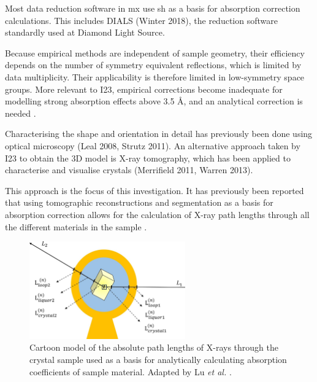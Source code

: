 Most data reduction software in \ac{mx} use \ac{sh} as a basis for absorption correction calculations. This includes DIALS \cite{Winter2018}(Winter 2018), the reduction software standardly used at Diamond Light Source.

Because empirical methods are independent of sample geometry, their efficiency depends on the number of symmetry equivalent reflections, which is limited by data multiplicity. Their applicability is therefore limited in low-symmetry space groups. More relevant to I23, empirical corrections become inadequate for modelling strong absorption effects above 3.5 Å, and an analytical correction is needed \cite{Kazantsev2021}.

Characterising the shape and orientation in detail has previously been done using optical microscopy \cite{Leal2008, Strutz2011} (Leal 2008, Strutz 2011). An alternative approach taken by I23 to obtain the 3D model is X-ray tomography, which has been applied to characterise and visualise crystals \cite{Merrifield2011, Warren2013}(Merrifield 2011, Warren 2013).

This approach is the focus of this investigation. It has previously been reported that using tomographic reconstructions and segmentation as a basis for absorption correction allows for the calculation of X-ray path lengths through all the different materials in the sample \cite{Brockhauser2008}.

\begin{figure}
    \centering
    \includegraphics[width = 0.6\textwidth]{images/absorption correction diagram.jpg}
    \caption{Cartoon model of the absolute path lengths of X-rays through the crystal sample used as a basis for analytically calculating absorption coefficients of sample material. Adapted by Lu \textit{et al.} \cite{Lu}.
    }
    \label{fig:analytical correction model}
\end{figure}

